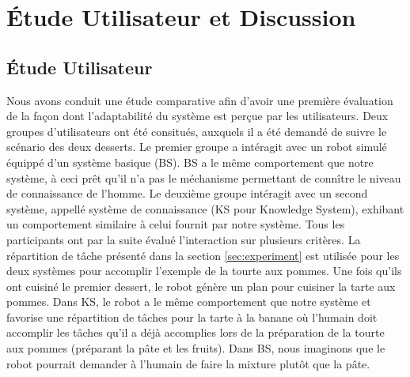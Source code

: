 \documentclass[a4paper,11pt,twoside]{StyleThese}
\begin{document}


\section{Étude Utilisateur et Discussion}
\label{study}

\subsection{Étude Utilisateur}
Nous avons conduit une étude comparative afin d'avoir une première évaluation de la façon dont l'adaptabilité du système est perçue par les utilisateurs. Deux groupes d'utilisateurs ont été consitués, auxquels il a été demandé de suivre le scénario des deux desserts. Le premier groupe a intéragit avec un robot simulé équippé d'un système basique (BS). BS a le même comportement que notre système, à ceci prêt qu'il n'a pas le méchanisme permettant de connître le niveau de connaissance de l'homme. Le deuxième groupe intéragit avec un second système, appellé système de connaissance (KS pour Knowledge System), exhibant un comportement similaire à celui fournit par notre système.
Tous les participants ont par la suite évalué l'interaction sur plusieurs critères.
%
La répartition de tâche présenté dans la section \ref{sec:experiment} 
est utilisée pour les deux systèmes pour accomplir l'exemple de la tourte aux pommes. Une fois qu'ils ont cuisiné le premier dessert, le robot génère un plan pour cuisiner la tarte aux pommes. Dans KS, le robot a le même comportement que notre système et favorise une répartition de tâches pour la tarte à la banane où l'humain doit accomplir les tâches qu'il a déjà accomplies lors de la préparation de la tourte aux pommes (préparant la pâte et les fruits).
Dans BS, nous imaginons que le robot pourrait demander à l'humain de faire la mixture plutôt que la pâte.
\end{document}
